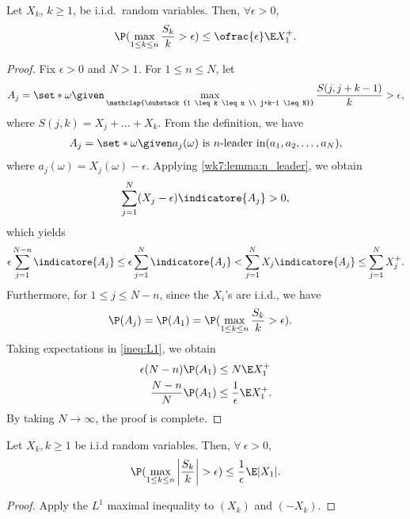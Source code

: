 \documentclass[../aipt.tex]{subfiles}
\begin{document}
\begin{Theorem} \label{wk7:thm:maximal_inequality}
Let $X_k$, $k \geq 1$, be i.i.d.\ random variables. Then, $\forall \epsilon > 0$,
\begin{align*}
\P(\max_{1 \leq k \leq n} \frac{S_k}{k} > \epsilon) \leq \ofrac{\epsilon}\E X_1^+.
\end{align*}
\end{Theorem}
\begin{proof}
Fix $\epsilon > 0$ and $N>1$. For $1\leq n \leq N$, let
\begin{align*}
A_j = \set*{\omega\given \max_{\mathclap{\substack{1 \leq k \leq n \\ j+k-1 \leq N}}} \frac{S(j,j+k-1)}{k} > \epsilon},
\end{align*}
where $S(j,k) = X_j + \ldots + X_k$. From the definition, we have
\begin{align*}
A_j = \set*{\omega\given a_j(\omega) \ \text{is $n$-leader in} (a_1, a_2, \ldots, a_N)},
\end{align*}
where $a_j(\omega) = X_j(\omega) - \epsilon$.
Applying \cref{wk7:lemma:n_leader}, we obtain
\begin{align*}
\sum_{j=1}^N (X_j - \epsilon) \indicatore{A_j} > 0,
\end{align*}
which yields
\begin{align}
\epsilon \sum_{j=1}^{N-n} \indicatore{A_j} 
\leq \epsilon \sum_{j=1}^N \indicatore{A_j}
< \sum_{j=1}^N X_j \indicatore{A_j}
\leq \sum_{j=1}^N X_j^+. \label{ineq:L1}
\end{align}
Furthermore, for $1 \leq j \leq N- n$, since the $X_i$'s are i.i.d., we have
\begin{align*}
\P(A_j) 
= \P(A_1)
&= \P(\max_{1 \leq k \leq n} \frac{S_k}{k} > \epsilon).
\end{align*}
Taking expectations in \cref{ineq:L1}, we obtain
\begin{align*}
\epsilon (N-n) \P(A_1) &\leq N \E X_1^+ \\
\frac{N-n}{N} \P(A_1) &\leq \frac{1}{\epsilon} \E X_1^+.
\end{align*}
By taking $N \to \infty$, the proof is complete.
\end{proof}

\begin{Corollary} \label{wk7:cor:maximal_inequality}
Let $X_k, k \geq 1$ be i.i.d random variables. Then, $\forall\ \epsilon > 0$,
\begin{align*}
\P(\max_{1 \leq k \leq n} \left|\frac{S_k}{k}\right| > \epsilon) \leq \frac{1}{\epsilon} \E |X_1|.
\end{align*}
\end{Corollary}
\begin{proof}
Apply the $L^1$ maximal inequality to $(X_k)$ and $(-X_k)$.
\end{proof}
\end{document}
